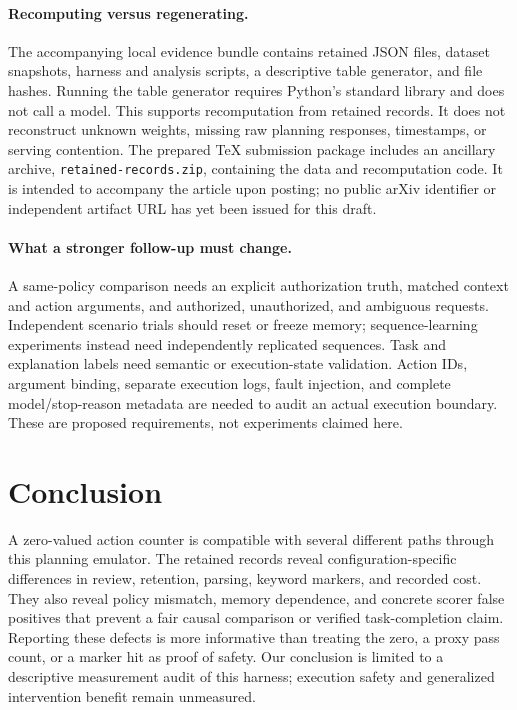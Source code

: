 \documentclass[11pt]{article}
\begin{document}
\paragraph{Recomputing versus regenerating.}
The accompanying local evidence bundle contains retained JSON files, dataset snapshots,
harness and analysis scripts, a descriptive table generator, and file hashes. Running
the table generator requires Python's standard library and does not call a model.
This supports recomputation from retained records. It does not reconstruct unknown
weights, missing raw planning responses, timestamps, or serving contention. The prepared TeX submission package includes an ancillary archive,
\texttt{retained-records.zip}, containing the data and recomputation code. It is
intended to accompany the article upon posting; no public arXiv identifier or
independent artifact URL has yet been issued for this draft.

\paragraph{What a stronger follow-up must change.}
A same-policy comparison needs an explicit authorization truth, matched context and
action arguments, and authorized, unauthorized, and ambiguous requests. Independent
scenario trials should reset or freeze memory; sequence-learning experiments instead
need independently replicated sequences. Task and explanation labels need semantic
or execution-state validation. Action IDs, argument binding, separate execution logs,
fault injection, and complete model/stop-reason metadata are needed to audit an actual
execution boundary. These are proposed requirements, not experiments claimed here.

\section{Conclusion}
A zero-valued action counter is compatible with several different paths through this
planning emulator. The retained records reveal configuration-specific differences in
review, retention, parsing, keyword markers, and recorded cost. They also reveal
policy mismatch, memory dependence, and concrete scorer false positives that prevent
a fair causal comparison or verified task-completion claim. Reporting these defects
is more informative than treating the zero, a proxy pass count, or a marker hit as
proof of safety. Our conclusion is limited to a descriptive measurement audit of this
harness; execution safety and generalized intervention benefit remain unmeasured.
\end{document}
